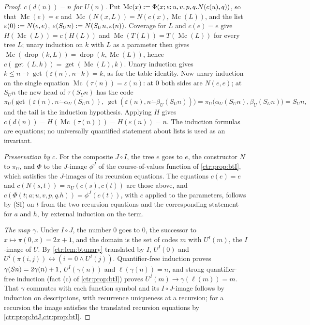 \begin{proof}
\emph{$c(d(n))=n$ for $U(n)$.} Put $\operatorname{Mc}(x)\mathrel{:=}\Phi(x;e;u,v,p,q.N(c(u),q))$,
so that $\operatorname{Mc}(e)=e$ and $\operatorname{Mc}(N(x,L))=N(c(x),\operatorname{Mc}(L))$,
and the list $\varepsilon(0)\mathrel{:=} N(e,e)$, $\varepsilon(S_Un)\mathrel{:=} N(S_Un,\varepsilon(n))$.
Coverage for $L$ and $c(e)=e$ give $H(\operatorname{Mc}(L))=c(H(L))$ and
$\operatorname{Mc}(T(L))=T(\operatorname{Mc}(L))$ for every tree $L$; unary induction on $k$
with $L$ as a parameter then gives
$\operatorname{Mc}(\operatorname{drop}(k,L))=\operatorname{drop}(k,\operatorname{Mc}(L))$, hence
$c(\operatorname{get}(L,k))=\operatorname{get}(\operatorname{Mc}(L),k)$. Unary induction gives
$k\le n\to\operatorname{get}(\varepsilon(n),n\mathbin{\dot-}k)=k$, as for the table identity.
Now unary induction on the single equation $\operatorname{Mc}(\tau(n))=\varepsilon(n)$: at $0$
both sides are $N(e,e)$; at $S_Un$ the new head of $\tau(S_Un)$ has the code
\[
 \pi_U\bigl(\operatorname{get}(\varepsilon(n),n\mathbin{\dot-}\alpha_U(S_Un)),\
 \operatorname{get}(\varepsilon(n),n\mathbin{\dot-}\beta_U(S_Un))\bigr)
 =\pi_U\bigl(\alpha_U(S_Un),\beta_U(S_Un)\bigr)=S_Un,
\]
and the tail is the induction hypothesis. Applying $H$ gives
$c(d(n))=H(\operatorname{Mc}(\tau(n)))=H(\varepsilon(n))=n$. The induction formulas are
equations; no universally quantified statement about lists is used as an invariant.

\emph{Preservation by $c$.} For the composite $J\circ I$, the tree $e$ goes to $e$, the
constructor $N$ to $\pi_U$, and $\Phi$ to the $J$-image $\phi^J$ of the course-of-values
function of \cref{ctr:prop:btI}, which satisfies the $J$-images of its recursion equations.
The equations $c(e)=e$ and $c(N(s,t))=\pi_U(c(s),c(t))$ are those above, and
$c(\Phi(t;a;u,v,p,q.h))=\phi^J(c(t))$, with $c$ applied to the parameters, follows by (SI) on
$t$ from the two recursion equations and the corresponding statement for $a$ and $h$, by
external induction on the term.

\emph{The map $\gamma$.} Under $I\circ J$, the number $0$ goes to $0$, the successor to
$x\mapsto\pi(0,x)=2x+1$, and the domain is the set of codes $m$ with $U^I(m)$, the $I$-image
of $U$. By \cref{ctr:lem:btunary} translated by $I$, $U^I(0)$ and
$U^I(\pi(i,j))\leftrightarrow(i=0\land U^I(j))$. Quantifier-free induction proves
$\gamma(S n)=2\gamma(n)+1$, $U^I(\gamma(n))$ and $\ell(\gamma(n))=n$, and strong
quantifier-free induction (fact (c) of \cref{ctr:prop:btI}) proves
$U^I(m)\to\gamma(\ell(m))=m$. That $\gamma$ commutes with each function symbol and its
$I\circ J$-image follows by induction on descriptions, with recurrence uniqueness at a
recursion; for a recursion the image satisfies the translated recursion equations by
\cref{ctr:prop:btJ,ctr:prop:btI}.


\end{proof}
